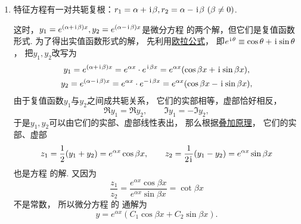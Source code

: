 \begin{enumerate}
	从而微分方程  的
	通解为\begin{equation}
		y = (C_1 + C_2 x) e^{r_1 x}.
	\end{equation}

	\item 特征方程有一对共轭复根：\(r_1 = \alpha+\kern1pt\mathrm{i}\kern1pt\beta, r_2 = \alpha-\kern1pt\mathrm{i}\kern1pt\beta \ (\beta\neq0)\).

	这时，\(y_1 = e^{(\alpha+\kern1pt\mathrm{i}\kern1pt\beta)x}, y_2 = e^{(\alpha-\kern1pt\mathrm{i}\kern1pt\beta)x}\)是微分方程  的两个解，但它们是复值函数形式.
	为了得出实值函数形式的解，
	先利用\hyperref[equation:复数.欧拉公式]{欧拉公式}，
	即\(e^{\kern1pt\mathrm{i}\kern1pt\theta} \equiv \cos\theta+\kern1pt\mathrm{i}\kern1pt\sin\theta\)，
	把\(y_1,y_2\)改写为\begin{gather*}
		y_1 = e^{(\alpha+\kern1pt\mathrm{i}\kern1pt\beta)x} = e^{\alpha x} \cdot e^{\kern1pt\mathrm{i}\kern1pt\beta x}
		= e^{\alpha x} (\cos\beta x + \kern1pt\mathrm{i}\kern1pt \sin\beta x), \\
		y_2 = e^{(\alpha-\kern1pt\mathrm{i}\kern1pt\beta)x} = e^{\alpha x} \cdot e^{-\kern1pt\mathrm{i}\kern1pt\beta x}
		= e^{\alpha x} (\cos\beta x - \kern1pt\mathrm{i}\kern1pt \sin\beta x),
	\end{gather*}
	由于复值函数\(y_1\)与\(y_2\)之间成共轭关系，
	它们的实部相等，虚部恰好相反，\begin{equation*}
		\Re y_1 = \Re y_2, \qquad
		\Im y_1 = -\Im y_2,
	\end{equation*}
	于是\(y_1,y_2\)可以由它们的实部、虚部线性表出，
	那么根据\hyperref[theorem:微分方程.二阶非齐次线性微分方程的解的叠加原理]{叠加原理}，
	它们的实部、虚部\begin{equation*}
		z_1 = \frac{1}{2} (y_1 + y_2) = e^{\alpha x} \cos\beta x,
		\qquad
		z_2 = \frac{1}{2\kern1pt\mathrm{i}\kern1pt} (y_1 - y_2) = e^{\alpha x} \sin\beta x
	\end{equation*}也是方程  的解.
	又因为\begin{equation*}
		\frac{z_1}{z_2}
		= \frac{e^{\alpha x} \cos\beta x}{e^{\alpha x} \sin\beta x}
		= \cot\beta x
	\end{equation*}不是常数，
	所以微分方程  的
	通解为\begin{equation}
		y = e^{\alpha x} (C_1 \cos\beta x + C_2 \sin\beta x).
	\end{equation}
\end{enumerate}

